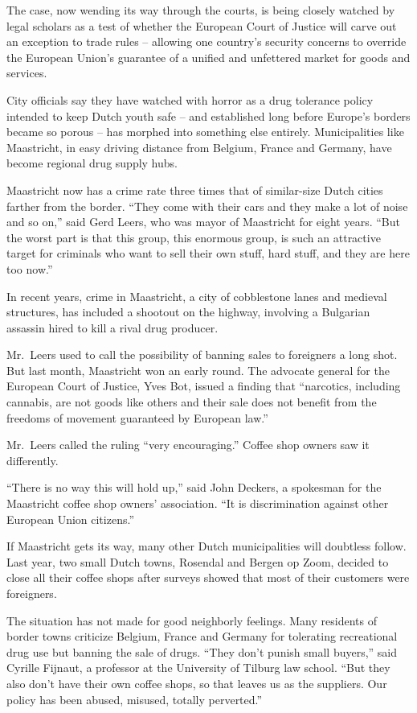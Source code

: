 ﻿\documentclass[12pt]{article}
\begin{document}
The case, now wending its way through the courts, is being closely watched by legal scholars as a
test of whether the European Court of Justice will carve out an exception to trade rules -- allowing
one country's security concerns to override the European Union's guarantee of a unified and
unfettered market for goods and services.

City officials say they have watched with horror as a drug tolerance policy intended to keep Dutch
youth safe -- and established long before Europe's borders became so porous -- has morphed into
something else entirely. Municipalities like Maastricht, in easy driving distance from Belgium,
France and Germany, have become regional drug supply hubs.

Maastricht now has a crime rate three times that of similar-size Dutch cities farther from the
border. ``They come with their cars and they make a lot of noise and so on,'' said Gerd Leers, who
was mayor of Maastricht for eight years. ``But the worst part is that this group, this enormous
group, is such an attractive target for criminals who want to sell their own stuff, hard stuff, and
they are here too now.''

In recent years, crime in Maastricht, a city of cobblestone lanes and medieval structures, has
included a shootout on the highway, involving a Bulgarian assassin hired to kill a rival drug
producer.

Mr.~Leers used to call the possibility of banning sales to foreigners a long shot. But last month,
Maastricht won an early round. The advocate general for the European Court of Justice, Yves Bot,
issued a finding that ``narcotics, including cannabis, are not goods like others and their sale does
not benefit from the freedoms of movement guaranteed by European law.''

Mr.~Leers called the ruling ``very encouraging.'' Coffee shop owners saw it differently.

``There is no way this will hold up,'' said John Deckers, a spokesman for the Maastricht coffee shop
owners' association. ``It is discrimination against other European Union citizens.''

If Maastricht gets its way, many other Dutch municipalities will doubtless follow. Last year, two
small Dutch towns, Rosendal and Bergen op Zoom, decided to close all their coffee shops after
surveys showed that most of their customers were foreigners.

The situation has not made for good neighborly feelings. Many residents of border towns criticize
Belgium, France and Germany for tolerating recreational drug use but banning the sale of drugs.
``They don't punish small buyers,'' said Cyrille Fijnaut, a professor at the University of Tilburg
law school. ``But they also don't have their own coffee shops, so that leaves us as the suppliers.
Our policy has been abused, misused, totally perverted.''
\end{document}
